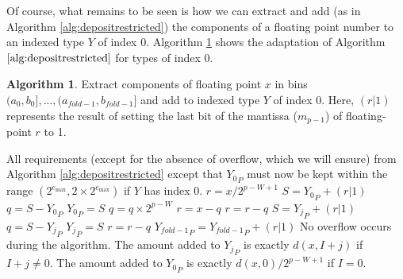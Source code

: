 \documentclass[12pt]{article}
\providecommand{\max}{\ensuremath{\text{max}}}
\providecommand{\To}{\ensuremath{\text{ to }}}
\theoremstyle{definition}
\newtheorem{alg}{Algorithm}[section]
\numberwithin{equation}{section}
\begin{document}
      Of course, what remains to be seen is how we can extract and add (as in Algorithm \ref{alg:depositrestricted}) the components of a floating point number to an indexed type $Y$ of index 0. Algorithm \ref{alg:deposit} shows the adaptation of Algorithm $\ref{alg:depositrestricted}$ for types of index 0.
      \begin{alg}
        Extract components of floating point $x$ in bins $(a_0, b_0], ..., (a_{fold - 1}, b_{fold - 1}]$ and add to indexed type $Y$ of index 0. Here, $(r | 1)$ represents the result of setting the last bit of the mantissa ($m_{p - 1}$) of floating-point $r$ to 1.
        \begin{algorithmic}[1]
          \Require
            \Statex All requirements (except for the absence of overflow, which we will ensure) from Algorithm \ref{alg:depositrestricted} except that ${Y_0}_P$ must now be kept within the range $(2^{e_{\max}}, 2 \times 2^{e_{\max}})$ if $Y$ has index 0.
              \State $r = x / 2^{p - W + 1}$ \label{alg:deposit:scaler}
              \State $S = {Y_0}_P + (r | 1)$ \label{alg:deposit:formS}
              \State $q = S - {Y_0}_P$ \label{alg:deposit:formq}
              \State ${Y_0}_P = S$
              \State $q = q \times 2^{p - W}$ \label{alg:deposit:scaleq}
              \State $r = x - q$ \label{alg:deposit:formr}
              \State $r = r - q$ \label{alg:deposit:formragain}
              \For{$j = 1 \To (fold - 2)$}
                \State $S = {Y_j}_P + (r | 1)$
                \State $q = S - {Y_j}_P$
                \State ${Y_j}_P = S$
                \State $r = r - q$
              \EndFor
              \State ${Y_{fold - 1}}_P = {Y_{fold - 1}}_P + (r | 1)$
            \Else
              \State{} \label{alg:deposit:callrestricted}
            \EndIf
          \EndFunction
          \Ensure
            \Statex No overflow occurs during the algorithm.
            \Statex The amount added to ${Y_j}_P$ is exactly $d(x, I + j)$ if $I + j \neq 0$.
            \Statex The amount added to ${Y_0}_P$ is exactly $d(x, 0)/2^{p - W + 1}$ if $I = 0$.
        \end{algorithmic}
        \label{alg:deposit}
      \end{alg}
\end{document}

